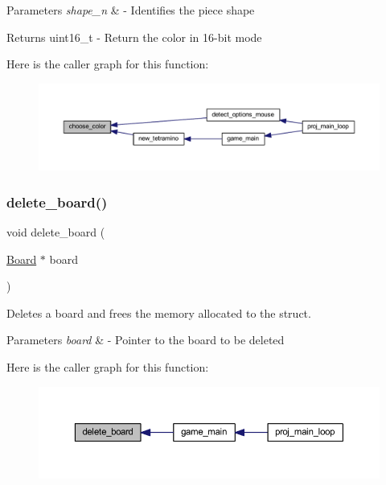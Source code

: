 \begin{DoxyParams}{Parameters}
{\em shape\+\_\+n} & -\/ Identifies the piece shape \\
\hline
\end{DoxyParams}
\begin{DoxyReturn}{Returns}
uint16\+\_\+t -\/ Return the color in 16-\/bit mode 
\end{DoxyReturn}
Here is the caller graph for this function\+:
\nopagebreak
\begin{figure}[H]
\begin{center}
\leavevmode
\includegraphics[width=350pt]{group__tetramino_gaec1f53f8b300eba51c8863f3fcb5478b_icgraph}
\end{center}
\end{figure}
\mbox{\label{group__tetramino_ga5ab138241d19c1826240ea803c970d9d}} 
\subsubsection{\texorpdfstring{delete\+\_\+board()}{delete\_board()}}
{\footnotesize\ttfamily void delete\+\_\+board (\begin{DoxyParamCaption}\item[{\mbox{\hyperlink{struct_board}{Board}} $\ast$}]{board }\end{DoxyParamCaption})}



Deletes a board and frees the memory allocated to the struct. 


\begin{DoxyParams}{Parameters}
{\em board} & -\/ Pointer to the board to be deleted \\
\hline
\end{DoxyParams}
Here is the caller graph for this function\+:
\nopagebreak
\begin{figure}[H]
\begin{center}
\leavevmode
\includegraphics[width=350pt]{group__tetramino_ga5ab138241d19c1826240ea803c970d9d_icgraph}
\end{center}
\end{figure}
\mbox{\label{group__tetramino_ga562ee8dcd3b145bafdf0311f1a3b7296}} 
